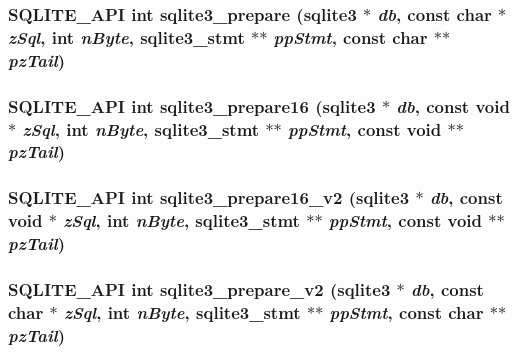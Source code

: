 \subsubsection{\setlength{\rightskip}{0pt plus 5cm}SQLITE\_\-API int sqlite3\_\-prepare (\bf{sqlite3} $\ast$ {\em db}, const char $\ast$ {\em z\-Sql}, int {\em n\-Byte}, \bf{sqlite3\_\-stmt} $\ast$$\ast$ {\em pp\-Stmt}, const char $\ast$$\ast$ {\em pz\-Tail})}\label{3_87_83_2sqlite3_8h_ea8957d895d7b5b82a814ab0cdb92288}


\subsubsection{\setlength{\rightskip}{0pt plus 5cm}SQLITE\_\-API int sqlite3\_\-prepare16 (\bf{sqlite3} $\ast$ {\em db}, const void $\ast$ {\em z\-Sql}, int {\em n\-Byte}, \bf{sqlite3\_\-stmt} $\ast$$\ast$ {\em pp\-Stmt}, const void $\ast$$\ast$ {\em pz\-Tail})}\label{3_87_83_2sqlite3_8h_c100b945af46a0ccf763fa39cac9feda}


\subsubsection{\setlength{\rightskip}{0pt plus 5cm}SQLITE\_\-API int sqlite3\_\-prepare16\_\-v2 (\bf{sqlite3} $\ast$ {\em db}, const void $\ast$ {\em z\-Sql}, int {\em n\-Byte}, \bf{sqlite3\_\-stmt} $\ast$$\ast$ {\em pp\-Stmt}, const void $\ast$$\ast$ {\em pz\-Tail})}\label{3_87_83_2sqlite3_8h_d007ebc349b63a751155cf507a72e412}


\subsubsection{\setlength{\rightskip}{0pt plus 5cm}SQLITE\_\-API int sqlite3\_\-prepare\_\-v2 (\bf{sqlite3} $\ast$ {\em db}, const char $\ast$ {\em z\-Sql}, int {\em n\-Byte}, \bf{sqlite3\_\-stmt} $\ast$$\ast$ {\em pp\-Stmt}, const char $\ast$$\ast$ {\em pz\-Tail})}\label{3_87_83_2sqlite3_8h_e5c653b392f2b8206f6a8fe71e5dc2e9}


